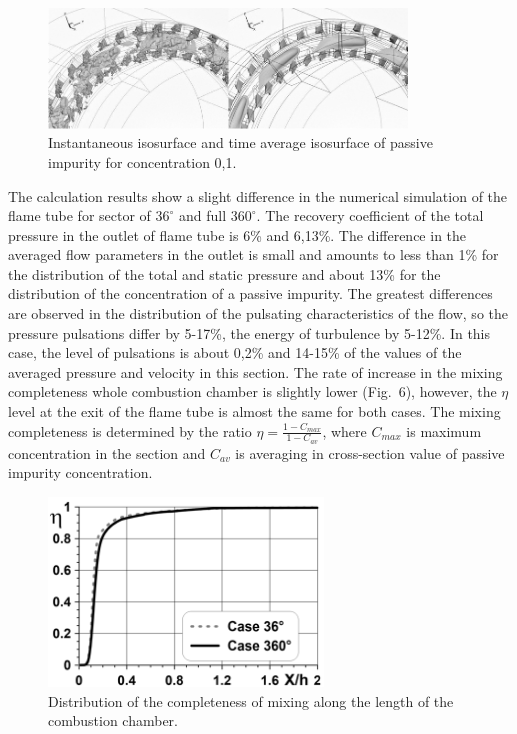 \documentclass[
11pt,%
tightenlines,%
twoside,%
onecolumn,%
nofloats,%
nobibnotes,%
nofootinbib,%
superscriptaddress,%
noshowpacs,%
centertags]%
{revtex4}
\begin{document}
\begin{figure}[h]
\setcaptionmargin{5mm}
\onelinecaptionstrue
\includegraphics[width=0.85\textwidth]{pics/p5.png}
\caption{Instantaneous isosurface and time average isosurface of passive impurity for concentration 0,1.}
\label{fig:p5}
\end{figure}

The calculation results show a slight difference in the numerical simulation of the flame tube for sector of $36^{\circ}$ and full $360^{\circ}$.
The recovery coefficient of the total pressure in the outlet of flame tube is 6\% and 6,13\%.
The difference in the averaged flow parameters in the outlet is small and amounts to less than 1\% for the distribution of the total and static pressure and about 13\% for the distribution of the concentration of a passive impurity.
The greatest differences are observed in the distribution of the pulsating characteristics of the flow, so the pressure pulsations differ by 5-17\%, the energy of turbulence by 5-12\%.
In this case, the level of pulsations is about 0,2\% and 14-15\% of the values of the averaged pressure and velocity in this section.
The rate of increase in the mixing completeness whole combustion chamber is slightly lower (Fig.~6), however, the $\eta$ level at the exit of the flame tube is almost the same for both cases.
The mixing completeness is determined by the ratio $\eta = \frac{1 - C_{max}}{1 - C_{av}}$, where $C_{max}$ is maximum concentration in the section and $C_{av}$ is averaging in cross-section value of passive impurity concentration.

\begin{figure}[h]
\setcaptionmargin{5mm}
\onelinecaptionstrue
\includegraphics[width=0.65\textwidth]{pics/p6.png}
\caption{Distribution of the completeness of mixing along the length of the combustion chamber.}
\label{fig:p6}
\end{figure}
\end{document}
